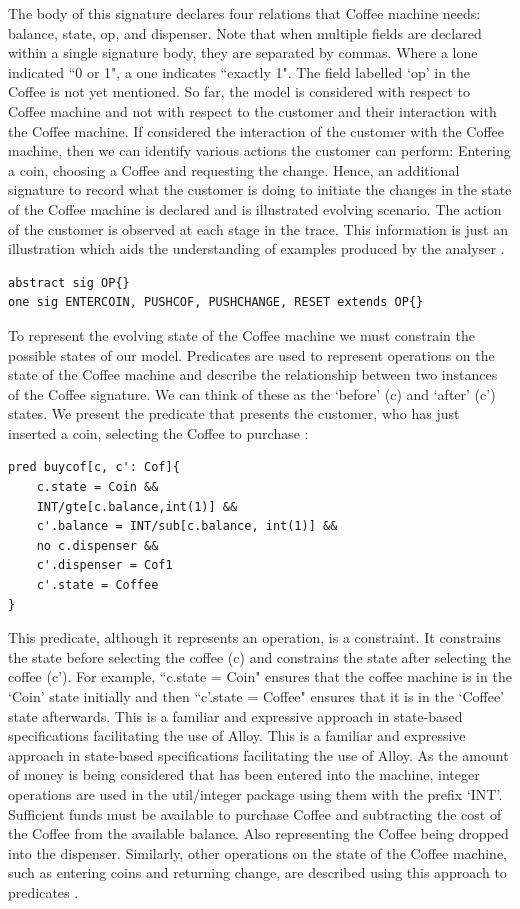 \documentclass[a4paper,10pt]{report}
\begin{document}
 The body of this signature declares four relations that Coffee machine needs: balance, state, op, and dispenser. Note that when multiple fields are declared within a single signature body, they are separated by commas. Where a lone indicated ``0 or 1", a one indicates ``exactly 1". The field labelled `op’ in the Coffee is not yet mentioned. So far, the model is considered with respect to Coffee machine and not with respect to the customer and their interaction with the Coffee machine. If considered the interaction of the customer with the Coffee machine, then we can identify various actions the customer can perform: Entering a coin, choosing a Coffee and requesting the change. Hence, an additional signature to record what the customer is doing to initiate the changes in the state of the Coffee machine is declared and is illustrated evolving scenario. The action of the customer is observed at each stage in the trace. This information is just an illustration which aids the understanding of examples produced by the analyser \cite{Boyatt}.
 
\begin{verbatim}	
abstract sig OP{}
one sig ENTERCOIN, PUSHCOF, PUSHCHANGE, RESET extends OP{}
\end{verbatim}

To represent the evolving state of the Coffee machine we must constrain the possible states of our model. Predicates are used to represent operations on the state of the Coffee machine and describe the relationship between two instances of the Coffee signature. We can think of these as the `before' (c) and `after' (c') states. We present the predicate that presents the customer, who has just inserted a coin, selecting the Coffee to purchase \cite{Boyatt}:

\begin{verbatim}
pred buycof[c, c': Cof]{
	c.state = Coin && 
	INT/gte[c.balance,int(1)] &&
	c'.balance = INT/sub[c.balance, int(1)] &&
	no c.dispenser &&
	c'.dispenser = Cof1
	c'.state = Coffee
}
\end{verbatim}

This predicate, although it represents an operation, is a constraint. It constrains the state before selecting the coffee (c) and constrains the state after selecting the coffee (c'). For example, ``c.state = Coin" ensures that the coffee machine is in the `Coin’ state initially and then ``c'.state = Coffee" ensures that it is in the `Coffee' state afterwards. This is a familiar and expressive approach in state-based specifications facilitating the use of Alloy. This is a familiar and expressive approach in state-based specifications facilitating the use of Alloy. As the amount of money is being considered that has been entered into the machine, integer operations are used in the util/integer package using them with the prefix `INT’. Sufficient funds must be available to purchase Coffee and subtracting the cost of the Coffee from the available balance. Also representing the Coffee being dropped into the dispenser. Similarly, other operations on the state of the Coffee machine, such as entering coins and returning change, are described using this approach to predicates \cite{Boyatt}.
\end{document}
